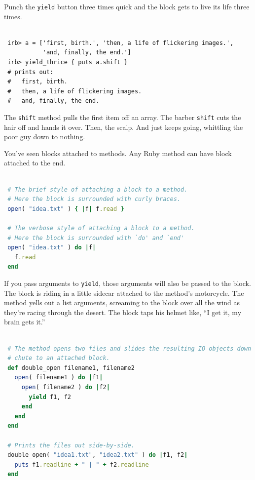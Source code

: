 \documentclass[10pt,twoside]{report}
\begin{document}
Punch the \lstinline[breaklines=true]|yield| button three times quick
and the block gets to live its life three times.


\begin{lstlisting}

 irb> a = ['first, birth.', 'then, a life of flickering images.',
           'and, finally, the end.']
 irb> yield_thrice { puts a.shift }
 # prints out:
 #   first, birth.
 #   then, a life of flickering images.
 #   and, finally, the end.

\end{lstlisting}


The \lstinline[breaklines=true]|shift| method pulls the first item off
an array.  The barber \lstinline[breaklines=true]|shift| cuts the hair
off and hands it over.  Then, the scalp.  And just keeps going,
whittling the poor guy down to nothing.

You've seen blocks attached to methods.  Any Ruby method can have
block attached to the end.


\begin{lstlisting}[basicstyle=\ttfamily\color{basiccolor},
    commentstyle = \ttfamily\color{commentcolor},
    keywordstyle=\ttfamily\color{keywordscolor},
    stringstyle=\color{stringcolor},
    language=Ruby,
    basicstyle=\small\ttfamily,
    showstringspaces=false,
  ]

 # The brief style of attaching a block to a method.
 # Here the block is surrounded with curly braces.
 open( "idea.txt" ) { |f| f.read }

 # The verbose style of attaching a block to a method.
 # Here the block is surrounded with `do' and `end'
 open( "idea.txt" ) do |f|
   f.read
 end

\end{lstlisting}


If you pass arguments to \lstinline[breaklines=true]|yield|, those
arguments will also be passed to the block. The block is riding in a
little sidecar attached to the method's motorcycle.  The method yells
out a list arguments, screaming to the block over all the wind as
they're racing through the desert.  The block taps his helmet like,
``I get it, my brain gets it.''


\begin{lstlisting}[basicstyle=\ttfamily\color{basiccolor},
    commentstyle = \ttfamily\color{commentcolor},
    keywordstyle=\ttfamily\color{keywordscolor},
    stringstyle=\color{stringcolor},
    language=Ruby,
    basicstyle=\small\ttfamily,
    showstringspaces=false,
  ]

 # The method opens two files and slides the resulting IO objects down the
 # chute to an attached block.
 def double_open filename1, filename2
   open( filename1 ) do |f1|
     open( filename2 ) do |f2|
       yield f1, f2
     end
   end
 end

 # Prints the files out side-by-side.
 double_open( "idea1.txt", "idea2.txt" ) do |f1, f2|
   puts f1.readline + " | " + f2.readline
 end

\end{lstlisting}
\end{document}
